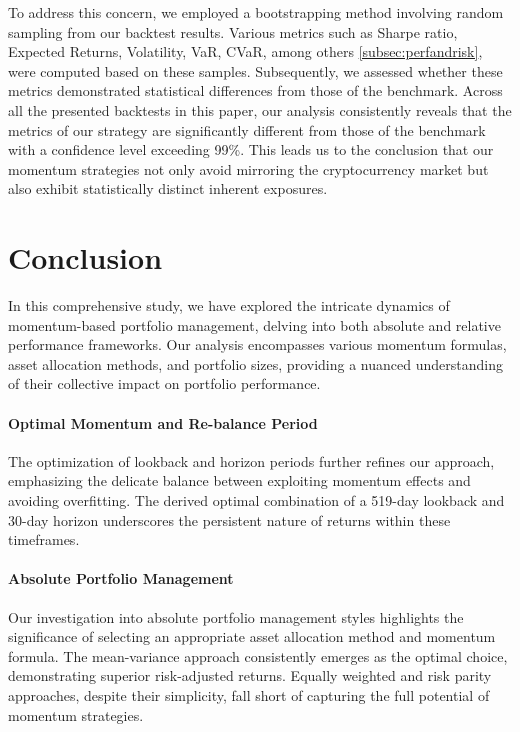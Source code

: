 \documentclass{article}
\begin{document}
To address this concern, we employed a bootstrapping method involving random sampling from our backtest results. Various metrics such as Sharpe ratio, Expected Returns, Volatility, VaR, CVaR, among others \ref{subsec:perfandrisk}, were computed based on these samples. Subsequently, we assessed whether these metrics demonstrated statistical differences from those of the benchmark. Across all the presented backtests in this paper, our analysis consistently reveals that the metrics of our strategy are significantly different from those of the benchmark with a confidence level exceeding 99\%. This leads us to the conclusion that our momentum strategies not only avoid mirroring the cryptocurrency market but also exhibit statistically distinct inherent exposures.

\section{Conclusion}

In this comprehensive study, we have explored the intricate dynamics of momentum-based portfolio management, delving into both absolute and relative performance frameworks. Our analysis encompasses various momentum formulas, asset allocation methods, and portfolio sizes, providing a nuanced understanding of their collective impact on portfolio performance.

\paragraph{Optimal Momentum and Re-balance Period}

The optimization of lookback and horizon periods further refines our approach, emphasizing the delicate balance between exploiting momentum effects and avoiding overfitting. The derived optimal combination of a 519-day lookback and 30-day horizon underscores the persistent nature of returns within these timeframes.

\paragraph{Absolute Portfolio Management}

Our investigation into absolute portfolio management styles highlights the significance of selecting an appropriate asset allocation method and momentum formula. The mean-variance approach consistently emerges as the optimal choice, demonstrating superior risk-adjusted returns. Equally weighted and risk parity approaches, despite their simplicity, fall short of capturing the full potential of momentum strategies.\newline
\end{document}
